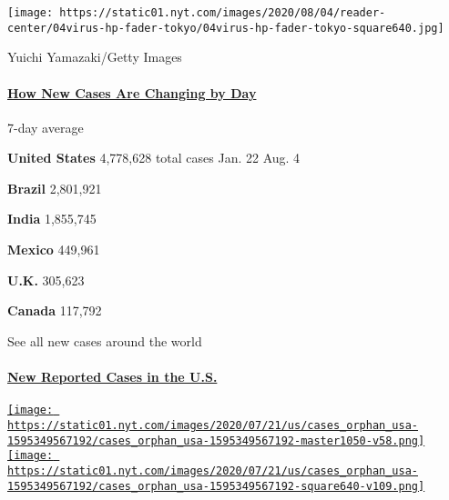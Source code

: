 \texttt{[image: https://static01.nyt.com/images/2020/08/04/reader-center/04virus-hp-fader-tokyo/04virus-hp-fader-tokyo-square640.jpg]}

 Yuichi Yamazaki/Getty Images

\hypertarget{how-new-cases-are-changing-by-day}{%
\paragraph{\texorpdfstring{\href{https://www.nytimes.com/interactive/2020/world/coronavirus-maps.html}{How
New Cases Are Changing by
Day}}{How New Cases Are Changing by Day}}\label{how-new-cases-are-changing-by-day}}

\href{https://www.nytimes.com/interactive/2020/us/coronavirus-us-cases.html}{}

7-day average

\textbf{United States} 4,778,628 total cases Jan. 22 Aug.
4\href{https://www.nytimes.com/interactive/2020/world/americas/brazil-coronavirus-cases.html}{}

\textbf{Brazil} 2,801,921
\href{https://www.nytimes.com/interactive/2020/world/asia/india-coronavirus-cases.html}{}

\textbf{India} 1,855,745
\href{https://www.nytimes.com/interactive/2020/world/americas/mexico-coronavirus-cases.html}{}

\textbf{Mexico} 449,961
\href{https://www.nytimes.com/interactive/2020/world/europe/united-kingdom-coronavirus-cases.html}{}

\textbf{U.K.} 305,623
\href{https://www.nytimes.com/interactive/2020/world/canada/canada-coronavirus-cases.html}{}

\textbf{Canada} 117,792

\href{https://www.nytimes.com/interactive/2020/world/coronavirus-maps.html}{}

See all new cases around the world

\hypertarget{new-reported-cases-in-the-us}{%
\paragraph{\texorpdfstring{\href{https://www.nytimes.com/interactive/2020/us/coronavirus-us-cases.html}{New
Reported Cases in the
U.S.}}{New Reported Cases in the U.S.}}\label{new-reported-cases-in-the-us}}

\href{https://www.nytimes.com/interactive/2020/us/coronavirus-us-cases.html}{\texttt{[image: https://static01.nyt.com/images/2020/07/21/us/cases\_orphan\_usa-1595349567192/cases\_orphan\_usa-1595349567192-master1050-v58.png]}
\texttt{[image: https://static01.nyt.com/images/2020/07/21/us/cases\_orphan\_usa-1595349567192/cases\_orphan\_usa-1595349567192-square640-v109.png]}}

